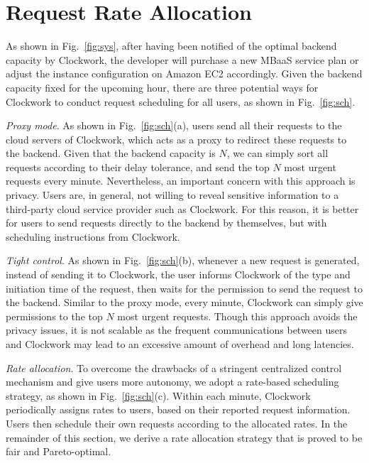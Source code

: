 \section{Request Rate Allocation}\label{sec:rateall}

As shown in Fig.~\ref{fig:sys}, after having been notified of the optimal backend capacity by Clockwork, the developer will purchase a new MBaaS service plan or adjust the instance configuration on Amazon EC2  accordingly. Given the backend capacity fixed for the upcoming hour, there are three potential ways for Clockwork to conduct request scheduling for all users, as shown in Fig.~\ref{fig:sch}. 


\emph{Proxy mode}. As shown in Fig.~\ref{fig:sch}(a), users send all their requests to the cloud servers of Clockwork, which acts as a proxy to redirect these requests to the backend. Given that the backend capacity is $N$, we can simply sort all requests according to their delay tolerance, and send the top $N$ most urgent requests every minute. Nevertheless, an important concern with this approach is privacy. Users are, in general, not willing to reveal sensitive information to a third-party cloud service provider such as Clockwork. For this reason, it is better for users to send requests directly to the backend by themselves, but with scheduling instructions from Clockwork.

\emph{Tight control}. As shown in Fig.~\ref{fig:sch}(b), whenever a new request is generated, instead of sending it to Clockwork, the user informs Clockwork of the type and initiation time of the request, then waits for the permission to send the request to the backend. Similar to the proxy mode, every minute, Clockwork can simply give permissions to the top $N$ most urgent requests. Though this approach avoids the privacy issues, it is not scalable as the frequent communications between users and Clockwork may lead to an excessive amount of overhead and long latencies. 

\emph{Rate allocation}. To overcome the drawbacks of a stringent centralized control mechanism and give users more autonomy, we adopt a rate-based scheduling strategy, as shown in Fig.~\ref{fig:sch}(c). Within each minute, Clockwork periodically assigns rates to users, based on their reported request information. Users then schedule their own requests according to the allocated rates. In the remainder of this section, we derive a rate allocation strategy that is proved to be fair and Pareto-optimal.  

